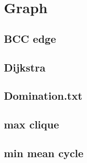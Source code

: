 \section{Graph}
		
	\subsection{BCC edge}
		
	\subsection{Dijkstra}
		
%		
	\subsection{Domination.txt}
		
%		
%		
%		
	\subsection{max clique}
		
	\subsection{min mean cycle}
		
%		
%		
